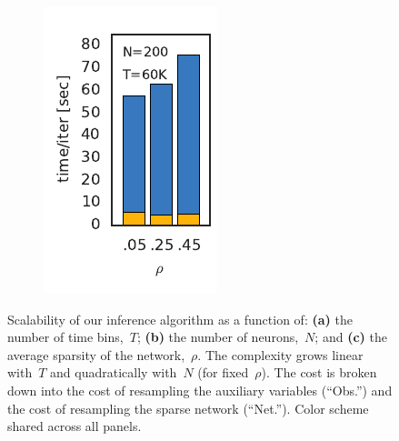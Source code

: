 \begin{figure}[t!]
\begin{subfigure}[b]{1.27in}
    \includegraphics[width=\textwidth]{figures/ch3/runtime_vs_rho.pdf}
    \label{fig:runtime_vs_rho}
  \end{subfigure}
  \vspace{-2em}
  \caption[Scalability of the proposed Bayesian inference algorithm]{
    Scalability of our inference algorithm as a function of: 
    \textbf{(a)} the number of time bins,~$T$;
    \textbf{(b)} the number of neurons,~$N$; and
    \textbf{(c)} the average sparsity of the network,~$\rho$.
    The complexity grows linear with~$T$ and quadratically with~$N$
    (for fixed~$\rho$). The cost is broken down into the cost of
    resampling the \polyagamma auxiliary variables (``Obs.'') and
    the cost of resampling the sparse network (``Net.''). Color
    scheme shared across all panels.
  }
  \label{fig:scalability}
\end{figure}


